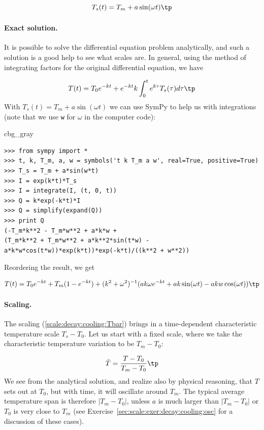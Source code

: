 \documentclass[graybox,envcountchap,sectrefs,final]{svmonodo}
\newenvironment{_cod_tight}[1]{
   \def\FrameCommand{\colorbox{#1}}
   \FrameRule0.6pt\MakeFramed {\FrameRestore}\vskip3mm}
   {\vskip0mm\endMakeFramed}
\newenvironment{cod}[1]{
\bgroup\rmfamily
\fboxsep=0mm\relax
\begin{_cod_tight}{#1}
\list{}{\parsep=-2mm\parskip=0mm\topsep=0pt\leftmargin=2mm
\rightmargin=2\leftmargin\leftmargin=4pt\relax}
\item\relax}
{\endlist\end{_cod_tight}\egroup}
\begin{document}
\begin{equation}
T_s(t) = T_m + a\sin(\omega t)
\label{scale:decay:cooling:Tst}
\tp
\end{equation}

\paragraph{Exact solution.}
It is possible to solve the differential equation problem analytically,
and such a solution is a good help to see what scales are.
In general, using the method of integrating factors for the
original differential equation, we have

\[ T(t) = T_0e^{-kt} + e^{-kt}k\int_0^t e^{k\tau}T_s(\tau)d\tau\tp\]
With $T_s(t)=T_m + a\sin (\omega t)$ we can use SymPy to help us with
integrations (note that we use \texttt{w} for $\omega$ in the computer code):

\begin{cod}{cbg_gray}\begin{Verbatim}[numbers=none,fontsize=\fontsize{9pt}{9pt},baselinestretch=0.95,xleftmargin=2mm]
>>> from sympy import *
>>> t, k, T_m, a, w = symbols('t k T_m a w', real=True, positive=True)
>>> T_s = T_m + a*sin(w*t)
>>> I = exp(k*t)*T_s
>>> I = integrate(I, (t, 0, t))
>>> Q = k*exp(-k*t)*I
>>> Q = simplify(expand(Q))
>>> print Q
(-T_m*k**2 - T_m*w**2 + a*k*w +
(T_m*k**2 + T_m*w**2 + a*k**2*sin(t*w) -
a*k*w*cos(t*w))*exp(k*t))*exp(-k*t)/((k**2 + w**2))
\end{Verbatim}
\end{cod}
\noindent
Reordering the result, we get

\[ T(t) = T_0e^{-kt} + T_m(1- e^{-kt}) +  (k^2 + \omega^2)^{-1}(ak\omega e^{-kt}
+ ak\sin (\omega t) - akw\cos(\omega t))\tp\]


\paragraph{Scaling.}
The scaling (\ref{scale:decay:cooling:Tbar}) brings in a time-dependent
characteristic temperature scale $T_s-T_0$. Let us start with a
fixed scale, where we take the characteristic temperature variation to
be $T_m - T_0$:

\[ \bar T = \frac{T-T_0}{T_m-T_0}\tp\]
We see from the analytical solution, and realize also by physical
reasoning, that $T$ sets out at $T_0$, but with time, it will oscillate
around $T_m$. The typical average temperature span is therefore
$|T_m-T_0|$, unless $a$ is much larger than $|T_m-T_0|$ or $T_0$ is
very close to $T_m$ (see Exercise~\ref{sec:scale:exer:decay:cooling:osc} for
a discussion of these cases).
\end{document}

